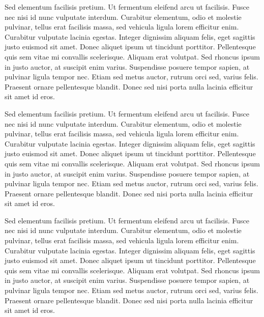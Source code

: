 \documentclass[a4paper,12pt]{article} %
\begin{document}
Sed elementum facilisis pretium. Ut fermentum eleifend arcu ut facilisis. Fusce nec nisi id nunc vulputate interdum. Curabitur elementum, odio et molestie pulvinar, tellus erat facilisis massa, sed vehicula ligula lorem efficitur enim. Curabitur vulputate lacinia egestas. Integer dignissim aliquam felis, eget sagittis justo euismod sit amet. Donec aliquet ipsum ut tincidunt porttitor. Pellentesque quis sem vitae mi convallis scelerisque. Aliquam erat volutpat. Sed rhoncus ipsum in justo auctor, at suscipit enim varius. Suspendisse posuere tempor sapien, at pulvinar ligula tempor nec. Etiam sed metus auctor, rutrum orci sed, varius felis. Praesent ornare pellentesque blandit. Donec sed nisi porta nulla lacinia efficitur sit amet id eros.

Sed elementum facilisis pretium. Ut fermentum eleifend arcu ut facilisis. Fusce nec nisi id nunc vulputate interdum. Curabitur elementum, odio et molestie pulvinar, tellus erat facilisis massa, sed vehicula ligula lorem efficitur enim. Curabitur vulputate lacinia egestas. Integer dignissim aliquam felis, eget sagittis justo euismod sit amet. Donec aliquet ipsum ut tincidunt porttitor. Pellentesque quis sem vitae mi convallis scelerisque. Aliquam erat volutpat. Sed rhoncus ipsum in justo auctor, at suscipit enim varius. Suspendisse posuere tempor sapien, at pulvinar ligula tempor nec. Etiam sed metus auctor, rutrum orci sed, varius felis. Praesent ornare pellentesque blandit. Donec sed nisi porta nulla lacinia efficitur sit amet id eros.

Sed elementum facilisis pretium. Ut fermentum eleifend arcu ut facilisis. Fusce nec nisi id nunc vulputate interdum. Curabitur elementum, odio et molestie pulvinar, tellus erat facilisis massa, sed vehicula ligula lorem efficitur enim. Curabitur vulputate lacinia egestas. Integer dignissim aliquam felis, eget sagittis justo euismod sit amet. Donec aliquet ipsum ut tincidunt porttitor. Pellentesque quis sem vitae mi convallis scelerisque. Aliquam erat volutpat. Sed rhoncus ipsum in justo auctor, at suscipit enim varius. Suspendisse posuere tempor sapien, at pulvinar ligula tempor nec. Etiam sed metus auctor, rutrum orci sed, varius felis. Praesent ornare pellentesque blandit. Donec sed nisi porta nulla lacinia efficitur sit amet id eros.
\end{document}
